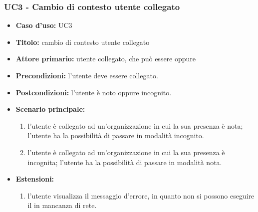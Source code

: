 \documentclass[casi-duso]{subfiles}
\begin{document}
\subsubsection{UC3 - Cambio di contesto utente collegato}
\label{sub:uc3utente}


\begin{itemize}
  \item \textbf{Caso d’uso:} UC3
  \item \textbf{Titolo:} cambio di contesto utente collegato
  \item \textbf{Attore primario:} utente collegato, che può essere  oppure 
  \item \textbf{Precondizioni:} l'utente deve essere collegato.
  \item \textbf{Postcondizioni:} l'utente è noto oppure incognito.
  \item \textbf{Scenario principale:} 
  \begin{enumerate}
    \item l'utente è collegato ad un'organizzazione in cui la sua presenza è nota; l'utente ha la possibilità di passare in modalità incognito.
    \item l'utente è collegato ad un'organizzazione in cui la sua presenza è incognita; l'utente ha la possibilità di passare in modalità nota.
  \end{enumerate}
  \item \textbf{Estensioni:} 
  \begin{enumerate}
    \item l'utente visualizza il messaggio d'errore, in quanto non si possono eseguire il  in mancanza di rete.
  \end{enumerate}
\end{itemize}
\end{document}
